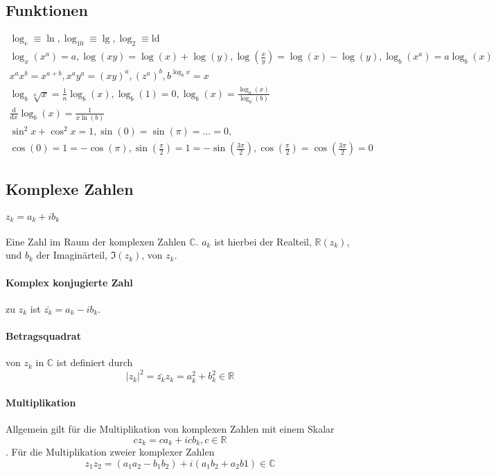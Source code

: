 \documentclass[oneside]{book}
\theoremstyle{definition}
\newcommand\setC{\mathbb C}
\newcommand\setR{\mathbb R}
\renewcommand{\d}{\mathrm d}
\renewcommand{\Re}{\mathbb{R}}
\begin{document}
\subsection{Funktionen}
\begin{eqnarray*}
\log_e \equiv \ln, \log_10 \equiv \lg, \log_2 \equiv \mathrm{ld}\\
\log_x(x^a) = a, \log(xy) = \log(x) + \log(y), \log(\frac{x}{y}) = \log(x) - \log(y), \log_b(x^a) = a \log_b(x)\\
x^a x^b = x^{a + b}, x^a y^a = (x y)^a, (z^a)^b, b^{\log_b x} = x\\
\log_b \sqrt[n]{x} = \frac{1}{n} \log_b(x), \log_b(1) = 0, \log_b(x) = \frac{\log_a(x)}{\log_a(b)}\\
\frac{\d}{\d x} \log_b (x) = \frac{1}{x \ln(b)}\\
\sin^2x + \cos^2 x = 1, \sin(0) = \sin(\pi) = \dots = 0, \\ \cos(0) = 1 = - \cos(\pi), \sin(\frac{\pi}{2}) = 1 = - \sin(\frac{3 \pi}{2}), \cos(\frac{\pi}{2}) = \cos(\frac{3 \pi}{2}) = 0
\end{eqnarray*}

\subsection{Komplexe Zahlen}

\paragraph{$z_k = a_k + i b_k$} Eine Zahl im Raum der komplexen Zahlen $\setC$. $a_k$ ist hierbei der Realteil, $\Re(z_k)$, und $b_k$ der Imaginärteil, $\Im(z_k)$, von $z_k$.
\paragraph{Komplex konjugierte Zahl} zu $z_k$ ist $\bar{z_k} = a_k - i b_k$.
\paragraph{Betragsquadrat} von $z_k$ in $\setC$ ist definiert durch $$|z_k|^2 = \bar{z_k} z_k = a_k^2 + b_k^2 \in \setR$$
\paragraph{Multiplikation} Allgemein gilt für die Multiplikation von komplexen Zahlen mit einem Skalar $$c z_k = c a_k + i c b_k, c \in \setR$$. Für die Multiplikation zweier komplexer Zahlen $$z_1 z_2 = (a_1 a_2-b_1b_2) + i(a_1b_2+a_2b1) \in \setC$$
\end{document}

